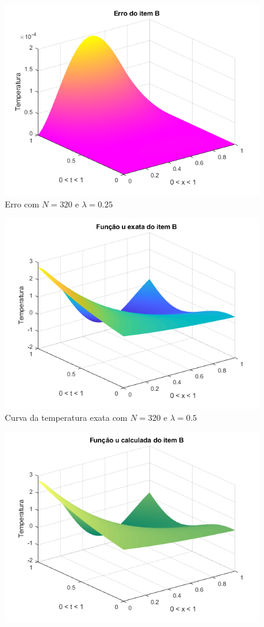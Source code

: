 \documentclass[12pt]{article}
\begin{document}
\begin{spacing}{1.5}
\begin{figure}
    \includegraphics[width=0.8\linewidth]{Primeira_Tarefa/ItemB/n320_lambda0-25_erro.png}
    \caption{Erro com $N=320$ e $\lambda=0.25$}
    \label{fig:B_n320lambda0-25_erro}
\end{figure}
\begin{figure}
    \centering
    \includegraphics[width=0.8\linewidth]{Primeira_Tarefa/ItemB/n320_lambda0-5_exata.png}
    \caption{Curva da temperatura exata com $N=320$ e $\lambda=0.5$}
    \label{fig:B_n320lambda0-5_exata}
\end{figure}
\begin{figure}
    \centering
    \includegraphics[width=0.8\linewidth]{Primeira_Tarefa/ItemB/n320_lambda0-5_calc.png}

\end{figure}
\end{spacing}
\end{document}
